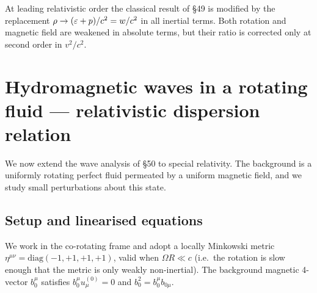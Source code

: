 \begin{relcorrection}
At leading relativistic order the classical result of \S49 is modified by
the replacement $\rho\to(\varepsilon+p)/c^{2}=w/c^{2}$ in all
inertial terms.  Both rotation and magnetic field are weakened in absolute
terms, but their ratio is corrected only at second order in $v^{2}/c^{2}$.
\end{relcorrection}


\section{Hydromagnetic waves in a rotating fluid --- relativistic
  dispersion relation}\label{sec:rel-50}

We now extend the wave analysis of \S50 to special relativity.  The
background is a uniformly rotating perfect fluid permeated by a uniform
magnetic field, and we study small perturbations about this state.

\subsection{Setup and linearised equations}

We work in the co-rotating frame and adopt a locally Minkowski metric
$\eta^{\mu\nu}=\mathrm{diag}(-1,+1,+1,+1)$, valid when $\Omega R\ll c$
(i.e.\ the rotation is slow enough that the metric is only weakly
non-inertial).  The background magnetic 4-vector $b_{0}^{\mu}$ satisfies
$b_{0}^{\mu}u^{(0)}_{\mu}=0$ and $b_{0}^{2}=b_{0}^{\mu}b_{0\mu}$.


